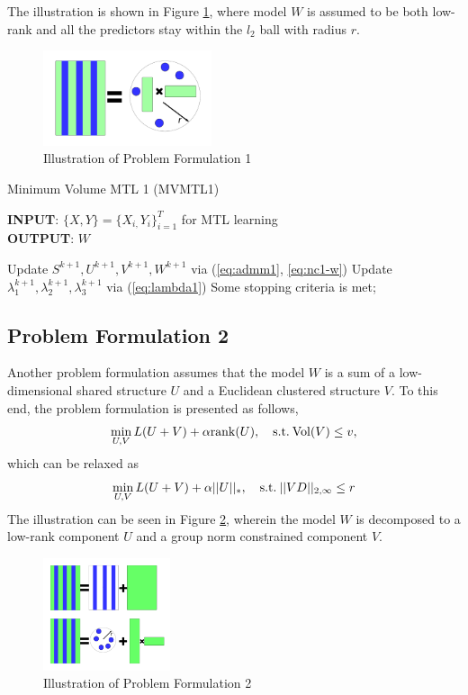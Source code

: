 \documentclass{article}
\newcounter{thm_counter}
\newcounter{lem_counter}
\newcounter{pro_counter}
\newcounter{ass_counter}
\begin{document}
%
The illustration is shown in Figure \ref{fig:mtl1}, where model $W$ is assumed to be both low-rank and all the predictors stay within the $l_2$ ball with radius $r$.
%
\begin{figure}[!htb]
\includegraphics[width= .5\textwidth, height=1.1in]{figures/mtl1.pdf}
\caption{Illustration of Problem Formulation 1}
\label{fig:mtl1}
\end{figure}
%
%
\begin{algorithm}
\label{alg:mvmtl1}
\caption{Minimum Volume MTL 1 (MVMTL1) }
\textbf{INPUT}: $\{X,Y\}=\{X_{i,}Y_{i}\}_{i=1}^{T}$ for MTL learning\\
\textbf{OUTPUT}: $W$ 
\begin{algorithmic}[1]
\REPEAT
\STATE Update ${S^{k+1}},{U^{k+1}},{V^{k+1}},{W^{k+1}}$ via (\ref{eq:admm1}, \ref{eq:nc1-w})
\STATE Update $\lambda^{k+1}_{1},\lambda^{k+1}_{2},\lambda^{k+1}_{3}$ via (\ref{eq:lambda1})
\UNTIL Some stopping criteria is met;
\end{algorithmic}
\end{algorithm}

\subsection{Problem Formulation 2}

Another problem formulation assumes that the model $W$ is a sum of a low-dimensional shared structure $U$ and a Euclidean clustered structure $V$. To this end, the problem formulation is presented as follows,
%
\begin{equation}
\mathop {\min }\limits_{U,V} L(U+V)
 + \alpha {\rm{rank}}(U),\quad{\rm{s.t.}}\:{\rm{Vol}}(V) \le v,
\label{eq:nonconvex2}
\end{equation}
which can be relaxed as
\begin{equation}
\mathop {\min }\limits_{U,V} L(U+V)  + \alpha ||U|{|_*},\quad{\rm{s.t.}}\:||VD|{|_{2,\infty }} \le  r
\label{eq:nc2-2}
\end{equation}
The illustration can be seen in Figure \ref{fig:mtl2}, wherein the model $W$ is decomposed to a low-rank component $U$ and a group norm constrained component $V$.
\begin{figure}[h]
\includegraphics[width= .5\textwidth, height=1.3in]{figures/mtl2.pdf}
\caption{Illustration of Problem Formulation 2}
\label{fig:mtl2}
\end{figure}
\end{document}
